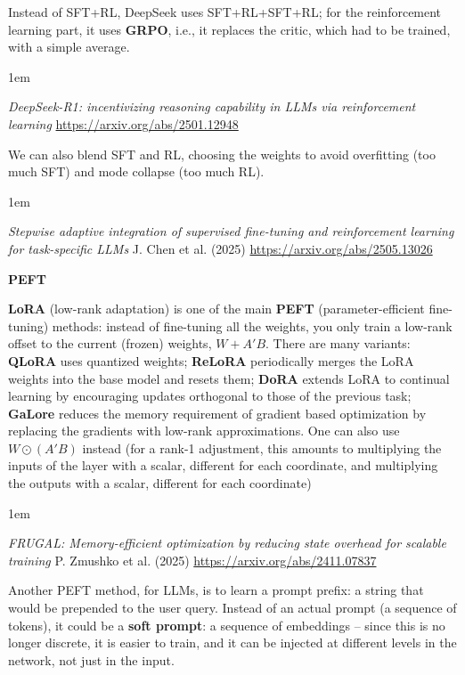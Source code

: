 \documentclass[a5paper]{article}
\let\d\textbf
\newenvironment{reference}{%
  \medskip\goodbreak
  \parskip 0pt
  \raggedright
  \leftskip 1em
  \obeylines
}{\par\medskip\goodbreak}
\def\subsection#1{{\par\bigskip\goodbreak\large\bfseries #1\par}}
\begin{document}
Instead of SFT+RL, DeepSeek uses SFT+RL+SFT+RL;
for the reinforcement learning part, it uses \d{GRPO}, i.e.,
it replaces the critic, which had to be trained, with a simple average.

\begin{reference}
  \emph{DeepSeek-R1: incentivizing reasoning capability in LLMs via reinforcement learning}
  \url{https://arxiv.org/abs/2501.12948}
\end{reference}

We can also blend SFT and RL, choosing the weights
to avoid overfitting (too much SFT)
and mode collapse (too much RL).

\begin{reference}
  \emph{Stepwise adaptive integration of supervised  fine-tuning and reinforcement learning  for task-specific LLMs}
  J. Chen et al. (2025)
  \url{https://arxiv.org/abs/2505.13026}
\end{reference}

\subsection{PEFT}

\d{LoRA} (low-rank adaptation) is one of the main
\d{PEFT} (parameter-efficient fine-tuning) methods:
instead of fine-tuning all the weights, you only train a low-rank offset to the current (frozen) weights,
$W+A'B$. There are many variants:
\d{QLoRA} uses quantized weights;
\d{ReLoRA} periodically merges the LoRA weights into the base model and resets them;
\d{DoRA} extends LoRA to continual learning by encouraging updates orthogonal to those of the previous task;
\d{GaLore} reduces the memory requirement of gradient based optimization by replacing the gradients with low-rank approximations.
One can also use $W\odot (A'B)$ instead (for a rank-1 adjustment, this amounts to multiplying
the inputs of the layer with a scalar,
different for each coordinate, and multiplying the outputs with a scalar, different for each coordinate)

\begin{reference}
  \emph{FRUGAL: Memory-efficient optimization by reducing state overhead for scalable training}
  P. Zmushko et al. (2025)
  \url{https://arxiv.org/abs/2411.07837}
\end{reference}

Another PEFT method, for LLMs, is to learn a prompt prefix: a string that would be prepended to the user query.
Instead of an actual prompt (a sequence of tokens), it could be a \d{soft prompt}: a sequence of embeddings --
since this is no longer discrete, it is easier to train, and it can be injected at different levels
in the network, not just in the input.
\end{document}
